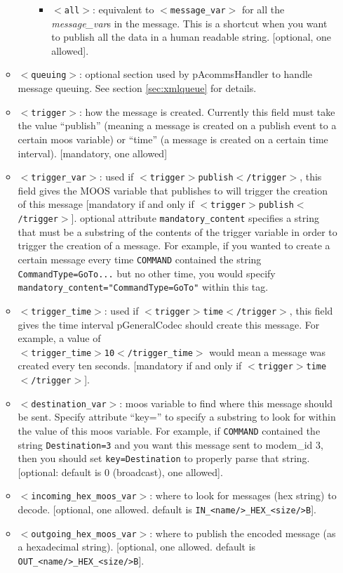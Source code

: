 \documentclass[11pt, letterpaper, oneside]{memoir}
\newcommand{\xmltag}[1]{\texttt{$<$#1$>$}}
\begin{document}
\begin{itemize}
\begin{itemize}
\begin{itemize}
\begin{itemize}
\item \xmltag{all}: equivalent to \xmltag{message\_var} for all the \textit{message\_var}s in the message. This is a shortcut when you want to publish all the data in a human readable string. [optional, one allowed].
\end{itemize}
\end{itemize}
\item \xmltag{queuing}: optional section used by pAcommsHandler to handle message queuing. See section \ref{sec:xmlqueue} for details.
\item \xmltag{trigger}: how the message is created. Currently this field must take the value ``publish'' (meaning a message is created on a publish event to a certain moos variable) or ``time'' (a message is created on a certain time interval). [mandatory, one allowed]
\item \xmltag{trigger\_var}: used if \xmltag{trigger$>$publish$<$/trigger}, this field gives the MOOS variable that publishes to will trigger the creation of this message [mandatory if and only if \xmltag{trigger$>$publish$<$/trigger}]. optional attribute \verb|mandatory_content| specifies a string that must be a substring of the contents of the trigger variable in order to trigger the creation of a message. For example, if you wanted to create a certain message every time \verb|COMMAND| contained the string \verb|CommandType=GoTo...| but no other time, you would specify \\ \verb|mandatory_content="CommandType=GoTo"| within this tag.
\item \xmltag{trigger\_time}: used if \xmltag{trigger$>$time$<$/trigger}, this field gives the time interval pGeneralCodec should create this message. For example, a value of \\ \xmltag{trigger\_time$>$10$<$/trigger\_time} would mean a message was created every ten seconds. [mandatory if and only if \xmltag{trigger$>$time$<$/trigger}].
\item \xmltag{destination\_var}: moos variable to find where this message should be sent. Specify attribute ``key='' to specify a substring to look for within the value of this moos variable. For example, if \verb|COMMAND| contained the string \verb|Destination=3| and you want this message sent to modem\_id 3, then you should set \verb|key=Destination| to properly parse that string. [optional: default is 0 (broadcast), one allowed].
\item \xmltag{incoming\_hex\_moos\_var}: where to look for messages (hex string) to decode. [optional, one allowed. default is \verb|IN_<name/>_HEX_<size/>B|].
\item \xmltag{outgoing\_hex\_moos\_var}: where to publish the encoded message (as a hexadecimal string). [optional, one allowed. default is \verb|OUT_<name/>_HEX_<size/>B|].
\end{itemize}
\end{itemize}
\end{document}
